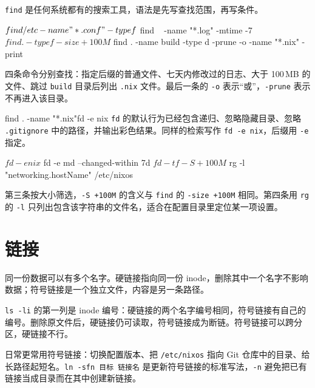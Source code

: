\texttt{find} 是任何系统都有的搜索工具，语法是先写查找范围，再写条件。

\begin{shellsession}
$ find /etc -name "*.conf" -type f
$ find ~ -name "*.log" -mtime -7
$ find . -type f -size +100M
$ find . -name build -type d -prune -o -name "*.nix" -print
\end{shellsession}

四条命令分别查找：指定后缀的普通文件、七天内修改过的日志、大于 100\,MB 的文件、跳过 \texttt{build} 目录后列出 \texttt{.nix} 文件。最后一条的 \texttt{-o} 表示“或”，\texttt{-prune} 表示不再进入该目录。

\begin{toolswap}{find . -name "*.nix"}{fd -e nix}
\texttt{fd} 的默认行为已经包含递归、忽略隐藏目录、忽略 \texttt{.gitignore} 中的路径，并输出彩色结果。同样的检索写作 \texttt{fd -e nix}，后缀用 \texttt{-e} 指定。
\end{toolswap}

\begin{shellsession}
$ fd -e nix
$ fd -e md --changed-within 7d
$ fd -t f -S +100M
$ rg -l "networking.hostName" /etc/nixos
\end{shellsession}

第三条按大小筛选，\texttt{-S +100M} 的含义与 \texttt{find} 的 \texttt{-size +100M} 相同。第四条用 \texttt{rg} 的 \texttt{-l} 只列出包含该字符串的文件名，适合在配置目录里定位某一项设置。

\section{链接}

同一份数据可以有多个名字。硬链接指向同一份 inode，删除其中一个名字不影响数据；符号链接是一个独立文件，内容是另一条路径。


\texttt{ls -li} 的第一列是 inode 编号：硬链接的两个名字编号相同，符号链接有自己的编号。删除原文件后，硬链接仍可读取，符号链接成为断链。符号链接可以跨分区，硬链接不行。

日常更常用符号链接：切换配置版本、把 \texttt{/etc/nixos} 指向 Git 仓库中的目录、给长路径起短名。\texttt{ln -sfn 目标 链接名} 是更新符号链接的标准写法，\texttt{-n} 避免把已有链接当成目录而在其中创建新链接。

